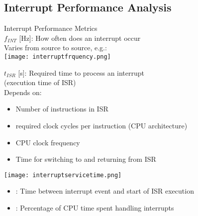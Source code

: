 \raggedcolumns
\columnbreak

\subsection{Interrupt Performance Analysis}

\begin{concept}{Interrupt Performance Metrics}\\
 $f_{INT}$ [Hz]: How often does an interrupt occur\\
 Varies from source to source, e.g.:\\
\texttt{[image: interruptfrquency.png]}

\begin{minipage}{0.7\linewidth}
 $t_{ISR}$ [s]: Required time to process an interrupt\\ (execution time of ISR)\\
    Depends on:
    \begin{itemize}
        \item Number of instructions in ISR
        \item required clock cycles per instruction (CPU architecture)
        \item CPU clock frequency
        \item Time for switching to and returning from ISR
    \end{itemize}
\end{minipage}
\begin{minipage}{0.3\linewidth}
    \vspace{-20mm}
    \texttt{[image: interruptservicetime.png]}
\end{minipage}

\begin{itemize}
    \item {}: Time between interrupt event and start of ISR execution
    \item {}: Percentage of CPU time spent handling interrupts
\end{itemize}

\end{concept}


